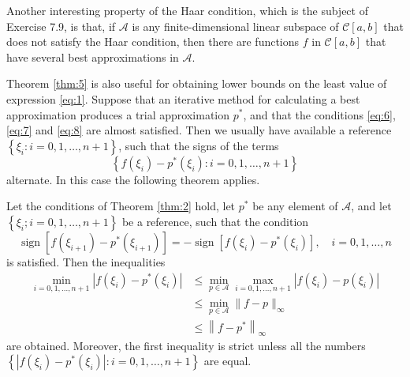 \documentclass[11pt]{article}
\begin{document}
\begin{remark}
Another interesting property of the Haar condition, which is the subject of Exercise 7.9, is that, if $\mathscr{A}$ is any finite-dimensional linear subspace of $\mathscr{C}[a, b]$ that does not satisfy the Haar condition, then there are functions $f$ in $\mathscr{C}[a, b]$ that have several best approximations in $\mathscr{A}$.
\end{remark}

Theorem \ref{thm:5} is also useful for obtaining lower bounds on the least value of expression \eqref{eq:1}. Suppose that an iterative method for calculating a best approximation produces a trial approximation $p^{*}$, and that the conditions \eqref{eq:6}, \eqref{eq:7} and \eqref{eq:8} are almost satisfied. Then we usually have available a reference $\left\{\xi_{i} : i=0,1, \ldots, n+1\right\}$, such that the signs of the terms 
$$\left\{f\left(\xi_{i}\right)-p^{*}\left(\xi_{i}\right) : i=0,1, \ldots, n+1\right\}
$$
alternate. In this case the following theorem applies.

\begin{theorem} \label{thm:7}
Let the conditions of Theorem \ref{thm:2} hold, let $p^{*}$ be any element of $\mathscr{A}$, and let $\left\{\xi_{i} ; i=0,1, \ldots, n+1\right\}$ be a reference, such that the condition
\begin{equation}
\operatorname{sign}\left[f\left(\xi_{i+1}\right)-p^{*}\left(\xi_{i+1}\right)\right]=-\operatorname{sign}\left[f\left(\xi_{i}\right)-p^{*}\left(\xi_{i}\right)\right],\quad 
i  =0,1, \ldots, n \label{eq:15}
\end{equation}
is satisfied. Then the inequalities
\begin{equation}
\begin{aligned}
\min _{i=0,1, \ldots, n+1}\left|f\left(\xi_{i}\right)-p^{*}\left(\xi_{i}\right)\right| & \leqslant \min _{p \in \mathscr{A}} \max _{i=0,1, \ldots, n+1}\left|f\left(\xi_{i}\right)-p\left(\xi_{i}\right)\right| \\
& \leqslant \min _{p \in \mathscr{A}}\|f-p\|_{\infty} \\
& \leqslant\left\|f-p^{*}\right\|_{\infty} 
\end{aligned}\label{eq:16}
\end{equation}
are obtained. Moreover, the first inequality is strict unless all the numbers $\left\{\left|f\left(\xi_{i}\right)-p^{*}\left(\xi_{i}\right)\right| : i=0,1, \ldots, n+1\right\}$ are equal.
\end{theorem}
\end{document}
